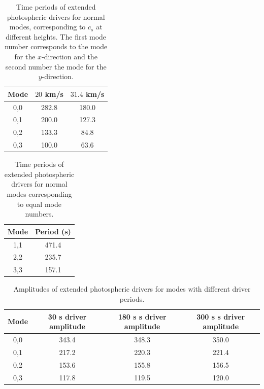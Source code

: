 \documentclass[preprint,authoryear,12pt]{elsarticle}
\begin{document}
\begin{table}
\centering
\begin{tabular}{c c c }
\hline
Mode &  $20$ km/s &  $
31.4$ km/s \\
\hline
0,0  & 282.8 & 180.0 \\
\hline
0,1  & 200.0 & 127.3  \\
\hline
0,2  & 133.3 & 84.8  \\
\hline
0,3  & 100.0 & 63.6  \\
\hline
\end{tabular} 
\caption{Time periods of extended photospheric drivers for normal modes, corresponding to $c_s$ at different heights. The first mode number corresponds to the mode for the $x$-direction and the second number the mode for the $y$-direction.}
\label{Table2}
\end{table}

\begin{table}\label{simcperiods}
\centering
\begin{tabular}{c c }
\hline
Mode   &  Period (s) \\
\hline
1,1 & 471.4  \\
\hline
2,2 & 235.7   \\
\hline
3,3 & 157.1   \\
\hline

\end{tabular} 
\caption{Time periods of extended photospheric drivers for normal modes corresponding to equal mode numbers.}
\label{Tableamps_equalmodenumber}
\end{table}

\begin{table}\label{simamps}
\centering
\begin{tabular}{c c c c }
\hline
Mode   & 30 s driver amplitude & 180 s s driver amplitude & 300 s s driver amplitude\\
\hline
0,0 & 343.4 & 348.3 & 350.0 \\
\hline
0,1 & 217.2 & 220.3 & 221.4 \\
\hline
0,2 & 153.6 & 155.8 & 156.5 \\
\hline
0,3 & 117.8 & 119.5 & 120.0 \\
\hline
\end{tabular} 
\caption{Amplitudes of extended photospheric drivers for modes with different driver periods.}
\label{Tableamps_30_180_300}
\end{table}
\end{document}
